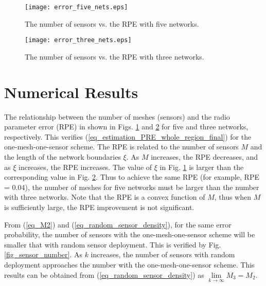 \documentclass[conference]{IEEEtran}
\begin{document}
\begin{figure}[!t]
\centering
\texttt{[image: error\_five\_nets.eps]}
\caption{The number of sensors vs. the RPE with five networks.} \label{fig_five_nets}
\end{figure}

\begin{figure}[!t]
\centering
\texttt{[image: error\_three\_nets.eps]}
\caption{The number of sensors vs. the RPE with three networks.} \label{fig_three_nets}
\end{figure}

\section{Numerical Results}

The relationship between the number of meshes (sensors) and the radio parameter error (RPE) in shown in Figs. \ref{fig_five_nets} and \ref{fig_three_nets}
for five and three networks, respectively.
This verifies (\ref{eq_estimation_PRE_whole_region_final}) for the one-mesh-one-sensor scheme.
The RPE is related to the number of sensors $M$ and the length of the network boundaries $\xi$.
As $M$ increases, the RPE decreases, and as $\xi$ increases, the RPE increases.
The value of $\xi$ in Fig. \ref{fig_five_nets} is larger than the corresponding value in Fig. \ref{fig_three_nets}.
Thus to achieve the same RPE (for example, RPE = 0.04), the number of meshes for five networks must be larger than the number with three networks.
Note that the RPE is a convex function of $M$, thus when $M$ is sufficiently large, the RPE improvement is not significant.

From (\ref{eq_M2}) and (\ref{eq_random_sensor_density}), for the same error probability, the number of sensors with the one-mesh-one-sensor scheme
will be smaller that with random sensor deployment.
This is verified by Fig. \ref{fig_sensor_number}.
As $k$ increases, the number of sensors with random deployment approaches the number with the one-mesh-one-sensor scheme.
This results can be obtained from (\ref{eq_random_sensor_density}) as $\mathop {\lim }\limits_{k \to \infty } {M_3} = {M_2}$.
\end{document}
